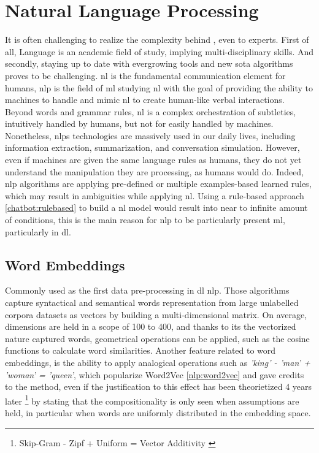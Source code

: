 \chapter{Natural Language Processing}
\label{chap:nlp}

It is often challenging to realize the complexity behind , even to experts. First of all, Language is an academic field of study, implying multi-disciplinary skills. And secondly, staying up to date with evergrowing tools and new \gls{sota} algorithms proves to be challenging. \gls{nl} is the fundamental communication element for humans, \gls{nlp} is the field of \gls{ml} studying \gls{nl} with the goal of providing the ability to machines to handle and mimic \gls{nl} to create human-like verbal interactions. Beyond words and grammar rules, \gls{nl} is a complex orchestration of subtleties, intuitively handled by humans, but not for easily handled by machines. Nonetheless, \glspl{nlp} technologies are massively used in our daily lives, including information extraction, summarization, and conversation simulation. However, even if machines are given the same language rules as humans, they do not yet understand the manipulation they are processing, as humans would do. Indeed, \gls{nlp} algorithms are applying pre-defined or multiple examples-based learned rules, which may result in ambiguities while applying \gls{nl}. Using a rule-based approach \ref{chatbot:rulebased} to build a \gls{nl} model would result into near to infinite amount of conditions, this is the main reason for \gls{nlp} to be particularly present \gls{ml}, particularly in \gls{dl}. 


\section{Word Embeddings}
\label{nlp:we}
Commonly used as the first data pre-processing in \gls{dl} \gls{nlp}. Those  algorithms capture syntactical and semantical words representation from large unlabelled corpora datasets as vectors by building a multi-dimensional matrix. On average, dimensions are held in a scope of 100 to 400, and thanks to its the vectorized nature captured words, geometrical operations can be applied, such as the cosine functions to calculate word similarities. Another feature related to word embeddings, is the ability to apply analogical operations such as \textit{'king' - 'man' + 'woman' = 'queen'}, which popularize Word2Vec \ref{nlp:word2vec} and gave credits to the method, even if the justification to this effect has been theorietized 4 years later \footnote{Skip-Gram - Zipf + Uniform = Vector Additivity \autocite{paper:gittens-etal-2017-skip}} by stating that the compositionality is only seen when assumptions are held, in particular when words are uniformly distributed in the embedding space.

